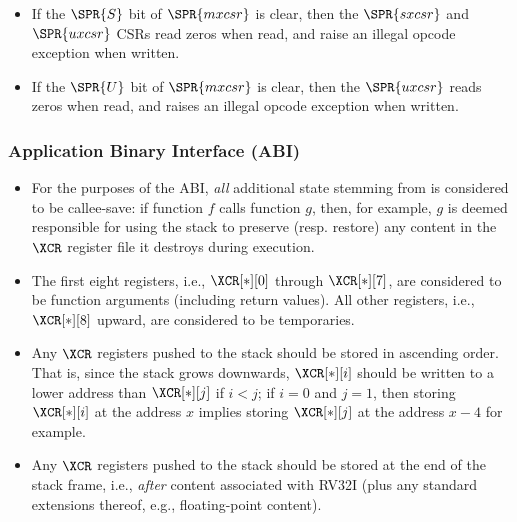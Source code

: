\begin{itemize}
\item If the $\SPR{S}$ bit of $\SPR{mxcsr}$ is clear, then the
    $\SPR{sxcsr}$ and $\SPR{uxcsr}$ CSRs read zeros when read, and
    raise an illegal opcode exception when written.
\item If the $\SPR{U}$ bit of $\SPR{mxcsr}$ is clear, then the
    $\SPR{uxcsr}$ reads zeros when read, and
    raises an illegal opcode exception when written.
\end{itemize}


\subsubsection{Application Binary Interface (ABI)}
\label{sec:spec:state:abi}

\begin{itemize}
\item For the purposes of the ABI, {\em all} additional state stemming from 
      \XCID is considered to be callee-save: if function $f$ calls function
      $g$, then, for example, $g$ is deemed responsible for using the stack
      to preserve (resp. restore) any content in the $\XCR$ register file 
      it destroys during execution.
\item The first eight registers, 
      i.e., $\XCR[*][0]$ through $\XCR[*][7]$, 
      are considered to be function arguments (including return values).
      All other registers, 
      i.e., $\XCR[*][8]$ upward,
      are considered to be temporaries.
\item Any $\XCR$ registers pushed to the stack should be stored 
      in ascending order.
      That is, since the stack grows downwards, 
      $\XCR[*][i]$
      should be written to a lower address than
      $\XCR[*][j]$
      if $i < j$; if $i = 0$ and $j = 1$, then storing $\XCR[*][i]$ at the
      address $x$ implies storing $\XCR[*][j]$ at the address $x - 4$ for
      example.
\item Any $\XCR$ registers pushed to the stack should be stored 
      at the end of the stack frame, 
      i.e., {\em after} content associated with RV32I (plus any standard 
      extensions thereof, e.g., floating-point content).
\end{itemize}


